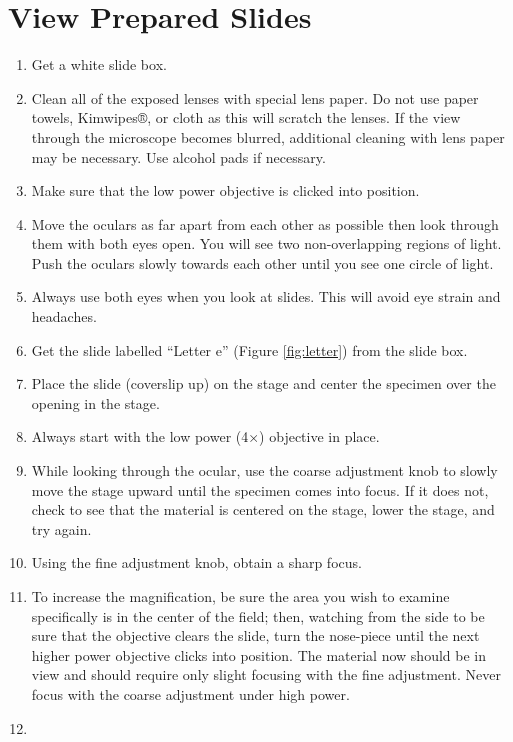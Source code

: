 \documentclass[]{book}
\providecommand{\tightlist}{%
  \setlength{\itemsep}{0pt}\setlength{\parskip}{0pt}}
\theoremstyle{definition}
\theoremstyle{definition}
\theoremstyle{definition}
\theoremstyle{remark}
\begin{document}
\section{View Prepared Slides}\label{view-prepared-slides}

\begin{enumerate}
\def\labelenumi{\arabic{enumi}.}
\tightlist
\item
  Get a white slide box.
\item
  Clean all of the exposed lenses with special lens paper. Do not use
  paper towels, Kimwipes®, or cloth as this will scratch the lenses. If
  the view through the microscope becomes blurred, additional cleaning
  with lens paper may be necessary. Use alcohol pads if necessary.
\item
  Make sure that the low power objective is clicked into position.
\item
  Move the oculars as far apart from each other as possible then look
  through them with both eyes open. You will see two non-overlapping
  regions of light. Push the oculars slowly towards each other until you
  see one circle of light.
\item
  Always use both eyes when you look at slides. This will avoid eye
  strain and headaches.
\item
  Get the slide labelled ``Letter e'' (Figure \ref{fig:letter}) from the
  slide box.
\item
  Place the slide (coverslip up) on the stage and center the specimen
  over the opening in the stage.
\item
  Always start with the low power (4×) objective in place.
\item
  While looking through the ocular, use the coarse adjustment knob to
  slowly move the stage upward until the specimen comes into focus. If
  it does not, check to see that the material is centered on the stage,
  lower the stage, and try again.
\item
  Using the fine adjustment knob, obtain a sharp focus.
\item
  To increase the magnification, be sure the area you wish to examine
  specifically is in the center of the field; then, watching from the
  side to be sure that the objective clears the slide, turn the
  nose-piece until the next higher power objective clicks into position.
  The material now should be in view and should require only slight
  focusing with the fine adjustment. Never focus with the coarse
  adjustment under high power.
\item

\end{enumerate}
\end{document}
